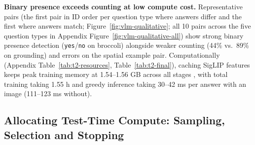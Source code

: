 \documentclass{article}
\begin{document}
\textbf{Binary presence exceeds counting at low compute cost.} Representative pairs (the first pair in ID order per question type where answers differ and the first where answers match; Figure~\ref{fig:vlm-qualitative}; all 10 pairs across the five question types in Appendix Figure~\ref{fig:vlm-qualitative-all}) show strong binary presence detection (\texttt{yes}/\texttt{no} on broccoli) alongside weaker counting (44\% vs.\ 89\% on grounding) and errors on the spatial example pair. Computationally (Appendix Table~\ref{tab:t2-resources}, Table~\ref{tab:t2-final}), caching SigLIP features \citep{zhai2023siglip} keeps peak training memory at 1.54--1.56 GB across all stages \citep{liu2023llava}, with total training taking 1.55 h and greedy inference taking 30--42 ms per answer with an image (111--123 ms without).

\subsection{Allocating Test-Time Compute: Sampling, Selection and Stopping}
\label{sec:results-ttc}
\end{document}
